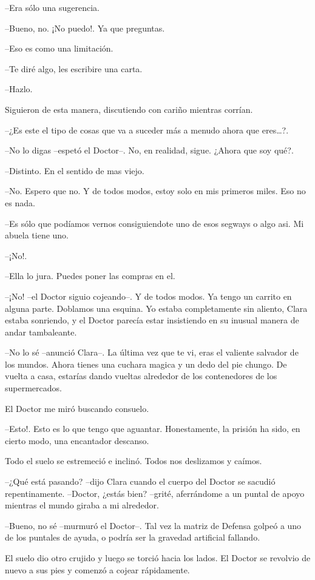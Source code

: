 --Era sólo una sugerencia.

--Bueno, no. ¡No puedo!. Ya que preguntas.

--Eso es como una limitación.

--Te diré algo, les escribire una carta.

--Hazlo.

Siguieron de esta manera, discutiendo con cariño mientras corrían.

--¿Es este el tipo de cosas que va a suceder más a menudo ahora que
eres\ldots{}?.

--No lo digas --espetó el Doctor--. No, en realidad, sigue. ¿Ahora
que soy qué?.

--Distinto. En el sentido de mas viejo.

--No. Espero que no. Y de todos modos, estoy solo en mis primeros
miles. Eso no es nada.

--Es sólo que podíamos vernos consiguiendote uno de esos segways o algo
asi. Mi abuela tiene uno.

--¡No!.

--Ella lo jura. Puedes poner las compras en el.

--¡No! --el Doctor siguio cojeando--. Y de todos modos. Ya tengo un
carrito en alguna parte. Doblamos una esquina. Yo estaba completamente
sin aliento, Clara estaba sonriendo, y el Doctor parecía estar
insistiendo en su inusual manera de andar tambaleante.

--No lo sé --anunció Clara--. La última vez que te vi, eras el
valiente salvador de los mundos. Ahora tienes una cuchara magica y un
dedo del pie chungo. De vuelta a casa, estarías dando vueltas alrededor
de los contenedores de los supermercados.

El Doctor me miró buscando consuelo.

--Esto!. Esto es lo que tengo que aguantar. Honestamente, la prisión ha
sido, en cierto modo, una encantador descanso.

Todo el suelo se estremeció e inclinó. Todos nos deslizamos y caímos.

--¿Qué está pasando? --dijo Clara cuando el cuerpo del Doctor se
sacudió repentinamente. --Doctor, ¿estás bien? --grité, aferrándome a
un puntal de apoyo mientras el mundo giraba a mi alrededor.

--Bueno, no sé --murmuró el Doctor--. Tal vez la matriz de Defensa
golpeó a uno de los puntales de ayuda, o podría ser la gravedad
artificial fallando.

El suelo dio otro crujido y luego se torció hacia los lados. El Doctor
se revolvio de nuevo a sus pies y comenzó a cojear rápidamente.

